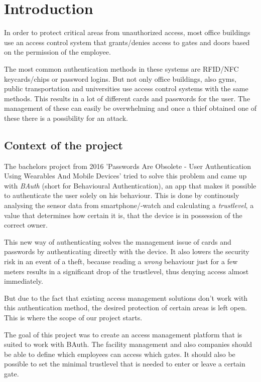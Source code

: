 \chapter{Introduction}

In order to protect critical areas from unauthorized access, most office buildings use an access control system that grants/denies access to gates and doors based on the permission of the employee.

The most common authentication methods in these systems are RFID/NFC keycards/chips or password logins.
But not only office buildings, also gyms, public transportation and universities use access control systems with the same methods. This results in a lot of different cards and passwords for the user. The management of these can easily be overwhelming and once a thief obtained one of these there is a possibility for an attack.

\section{Context of the project}
\label{Context of the project}

The bachelors project from 2016 'Passwords Are Obsolete - User Authentication Using Wearables And Mobile Devices' tried to solve this problem and came up with \emph{BAuth} (short for Behavioural Authentication), an app that makes it possible to authenticate the user solely on his behaviour. This is done by continously analysing the sensor data from smartphone/-watch and calculating a \emph{trustlevel}, a value that determines how certain it is, that the device is in possession of the correct owner.

This new way of authenticating solves the management issue of cards and passwords by authenticating directly with the device. It also lowers the security risk in an event of a theft, because reading a \emph{wrong} behaviour just for a few meters results in a significant drop of the trustlevel, thus denying access almost immediately.

But due to the fact that existing access management solutions don't work with this authentication method, the desired protection of certain areas is left open. This is where the scope of our project starts. 

The goal of this project was to create an access management platform that is suited to work with BAuth. The facility management and also companies should be able to define which employees can access which gates. It should also be possible to set the minimal trustlevel that is needed to enter or leave a certain gate.

